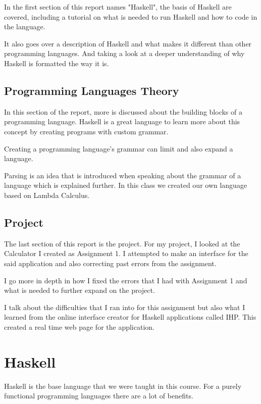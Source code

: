 \documentclass{article}
\begin{document}
\medskip\noindent
In the first section of this report names "Haskell", the basis of Haskell are covered, including a tutorial on what is needed to run Haskell and how to code in the language. 

\medskip\noindent
It also goes over a description of Haskell and what makes it different than other programming languages. And taking a look at a deeper understanding of why Haskell is formatted the way it is. 

\subsection{Programming Languages Theory}

In this section of the report, more is discussed about the building blocks of a programming language. Haskell is a great language to learn more about this concept by creating programs with custom grammar.

\medskip\noindent
Creating a programming language's grammar can limit and also expand a language.

\medskip\noindent
Parsing is an idea that is introduced when speaking about the grammar of a language which is explained further. In this class we created our own language based on Lambda Calculus.

\subsection{Project}

The last section of this report is the project. For my project, I looked at the Calculator I created as Assignment 1. I attempted to make an interface for the said application and also correcting past errors from the assignment.  

\medskip\noindent
I go more in depth in how I fixed the errors that I had with Assignment 1 and what is needed to further expand on the project. 

\medskip\noindent
I talk about the difficulties that I ran into for this assignment but also what I learned from the online interface creator for Haskell applications called IHP. This created a real time web page for the application.

\section{Haskell}\label{haskell}

Haskell is the base language that we were taught in this course. For a purely functional programming languages there are a lot of benefits.
\end{document}
